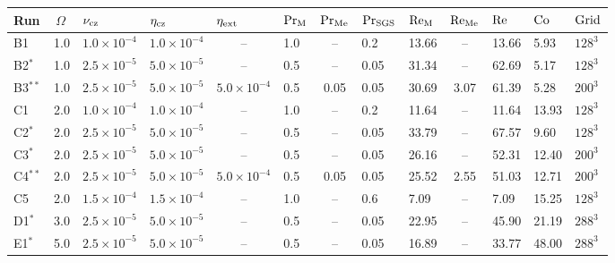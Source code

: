 \documentclass[baaa]{baaa}
\begin{document}
\begin{table*}[t!]
    \centering
    \begin{tabular}{llllclcllclll}
    \hline\hline\noalign{\smallskip}
     Run &\,$\Omega$ & \;\;\;\;\;$\nu_{\rm cz}$ & \;\;\;\;\;$\eta_{\rm cz}$ & \multicolumn{1}{l}{\;\;\;\;$\eta_{\rm ext}$} & $\rm Pr_{M}$ & \multicolumn{1}{l}{$\rm Pr_{\rm{Me}}$} & $\rm Pr_{\rm SGS}$ & $\rm Re_{M}$ & \multicolumn{1}{l}{$\rm Re_{\rm{Me}}$} & $\rm Re $& $\rm Co$ & $\rm Grid$\\
     \hline\noalign{\smallskip}
     B1 & 1.0 & $1.0 \times 10^{-4}$ & $1.0 \times 10^{-4}$ & -- &1.0 & -- & 0.2 & 13.66 & -- & 13.66 & 5.93 & $128^3$\\
     B2$^*$ & 1.0 & $2.5 \times 10^{-5}$ & $5.0 \times 10^{-5}$ & -- & 0.5 & -- & 0.05 & 31.34 & -- & 62.69 & 5.17 & $128^3$\\ 
     B3$^{**}$ & 1.0 & $2.5 \times 10^{-5}$ & $5.0 \times 10^{-5}$ & $5.0\times 10^{-4}$ & 0.5 & 0.05 & 0.05 & 30.69 & 3.07 & 61.39 & 5.28 & $200^3$\\ \hline\noalign{\smallskip}
     C1 & 2.0 & $1.0 \times 10^{-4}$ & $1.0 \times 10^{-4}$ & -- & 1.0 & -- & 0.2 & 11.64 & -- & 11.64 & 13.93 & $128^3$\\
     C2$^*$ & 2.0 & $2.5 \times 10^{-5}$ & $5.0 \times 10^{-5}$ & -- & 0.5 & -- & 0.05 & 33.79 & -- & 67.57 & 9.60 & $128^3$\\
     C3$^*$ & 2.0 & $2.5 \times 10^{-5}$ & $5.0 \times 10^{-5}$ & -- & 0.5 & -- & 0.05 & 26.16 & -- & 52.31 & 12.40 & $200^3$\\
     C4$^{**}$ & 2.0 & $2.5 \times 10^{-5}$ & $5.0 \times 10^{-5}$ & $5.0\times 10^{-4}$ & 0.5 & 0.05 & 0.05 & 25.52 & 2.55 & 51.03 & 12.71 & $200^3$\\
     C5 & 2.0 & $1.5 \times 10^{-4}$ & $1.5 \times 10^{-4}$ & -- & 1.0 & -- & 0.6 & 7.09 & -- & 7.09 & 15.25 & $128^3$\\ \hline\noalign{\smallskip}
     D1$^*$ & 3.0 & $2.5 \times 10^{-5}$ & $5.0 \times 10^{-5}$ & -- & 0.5 & -- & 0.05 & 22.95 & -- & 45.90 & 21.19 & $288^3$\\ \hline\noalign{\smallskip}
     E1$^*$ & 5.0 & $2.5 \times 10^{-5}$ & $5.0 \times 10^{-5}$ & -- & 0.5 & -- & 0.05 & 16.89 & -- & 33.77 & 48.00 & $288^3$\\
     \hline
    \end{tabular}

\end{table*}
\end{document}
